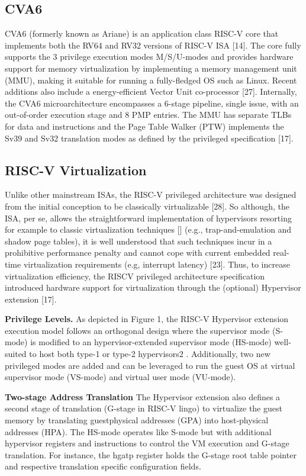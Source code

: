 \subsection*{CVA6}

CVA6 (formerly known as Ariane) is an application class
RISC-V core that implements both the RV64 and RV32
versions of RISC-V ISA [14]. The core fully supports the 3 privilege execution modes M/S/U-modes and provides hardware support for memory virtualization by implementing a
memory management unit (MMU), making it suitable for
running a fully-fledged OS such as Linux. Recent additions
also include a energy-efficient Vector Unit co-processor [27].
Internally, the CVA6 microarchitecture encompasses a 6-stage
pipeline, single issue, with an out-of-order execution stage and
8 PMP entries. The MMU has separate TLBs for data and
instructions and the Page Table Walker (PTW) implements the
Sv39 and Sv32 translation modes as defined by the privileged
specification [17].

\subsection*{RISC-V Virtualization}

Unlike other mainstream ISAs, the RISC-V privileged architecture was designed from the initial conception to be
classically virtualizable [28]. So although, the ISA, per se,
allows the straightforward implementation of hypervisors resorting for example to classic virtualization techniques []
(e.g., trap-and-emulation and shadow page tables), it is well
understood that such techniques incur in a prohibitive performance penalty and cannot cope with current embedded
real-time virtualization requirements (e.g, interrupt latency)
[23]. Thus, to increase virtualization efficiency, the RISCV privileged architecture specification introduced hardware
support for virtualization through the (optional) Hypervisor
extension [17].

\textbf{Privilege Levels.} As depicted in Figure 1, the RISC-V Hypervisor extension execution model follows an orthogonal
design where the supervisor mode (S-mode) is modified to an
hypervisor-extended supervisor mode (HS-mode) well-suited
to host both type-1 or type-2 hypervisors2
. Additionally, two
new privileged modes are added and can be leveraged to run
the guest OS at virtual supervisor mode (VS-mode) and virtual
user mode (VU-mode).


\textbf{Two-stage Address Translation} The Hypervisor extension
also defines a second stage of translation (G-stage in RISC-V
lingo) to virtualize the guest memory by translating guestphysical addresses (GPA) into host-physical addresses (HPA).
The HS-mode operates like S-mode but with additional hypervisor registers and instructions to control the VM execution and G-stage translation. For instance, the hgatp register
holds the G-stage root table pointer and respective translation
specific configuration fields.

